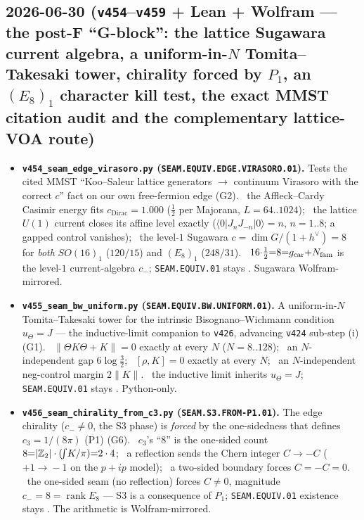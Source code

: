 \subsection*{2026-06-30 (\texttt{v454}--\texttt{v459} + Lean + Wolfram --- the post-F ``G-block'': the lattice Sugawara current algebra, a uniform-in-$N$ Tomita--Takesaki tower, chirality forced by $P_1$, an $(E_8)_1$ character kill test, the exact MMST citation audit and the complementary lattice-VOA route)}
\begin{itemize}
\item \textbf{\texttt{v454\_seam\_edge\_virasoro.py} (\texttt{SEAM.EQUIV.EDGE.VIRASORO.01}).} Tests the cited MMST
``Koo--Saleur lattice generators $\to$ continuum Virasoro with the correct $c$'' fact on our own free-fermion edge
(G2). \mE\ the Affleck--Cardy Casimir energy fits $c_{\mathrm{Dirac}}{=}1.000$ ($\tfrac12$ per Majorana, $L{=}64..1024$);
\mE\ the lattice $U(1)$ current closes its affine level exactly ($\langle0|J_nJ_{-n}|0\rangle{=}n$, $n{=}1..8$; a gapped
control vanishes); \mE\ the level-$1$ Sugawara $c{=}\dim G/(1{+}h^\vee){=}8$ for \emph{both} $SO(16)_1$ ($120/15$) and
$(E_8)_1$ ($248/31$). \mC\ $16{\cdot}\tfrac12{=}8{=}g_{\mathrm{car}}{+}N_{\mathrm{fam}}$ is the level-$1$ current-algebra $c_-$;
\texttt{SEAM.EQUIV.01} stays \mO. Sugawara Wolfram-mirrored.
\item \textbf{\texttt{v455\_seam\_bw\_uniform.py} (\texttt{SEAM.EQUIV.BW.UNIFORM.01}).} A uniform-in-$N$
Tomita--Takesaki tower for the intrinsic Bisognano--Wichmann condition $u_\Theta{=}J$ --- the inductive-limit companion
to \texttt{v426}, advancing \texttt{v424} sub-step (i) (G1). \mE\ $\|\Theta K\Theta{+}K\|{=}0$ exactly at every $N$
($N{=}8..128$); \mE\ an $N$-independent gap $6\log\tfrac32$; \mE\ $[\rho,K]{=}0$ exactly at every $N$; \mE\ an
$N$-independent neg-control margin $2\|K\|$. \mC\mO\ the inductive limit inherits $u_\Theta{=}J$;
\texttt{SEAM.EQUIV.01} stays \mO. Python-only.
\item \textbf{\texttt{v456\_seam\_chirality\_from\_c3.py} (\texttt{SEAM.S3.FROM-P1.01}).} The edge chirality
($c_-{\neq}0$, the S3 phase) is \emph{forced} by the one-sidedness that defines $c_3{=}1/(8\pi)$ (P1) (G6). \mE\
$c_3$'s ``$8$'' is the one-sided count $8{=}|\mathbb{Z}_2|\cdot(\!\int\!K/\pi){=}2\cdot4$; \mE\ a reflection sends the Chern
integer $C{\to}{-}C$ ($+1\!\to\!-1$ on the $p{+}ip$ model); \mE\ a two-sided boundary forces $C{=}{-}C{=}0$. \mC\ the
one-sided seam (no reflection) forces $C{\neq}0$, magnitude $c_-{=}8{=}\operatorname{rank}E_8$ --- S3 is a consequence
of $P_1$; \texttt{SEAM.EQUIV.01} existence stays \mO. The arithmetic is Wolfram-mirrored.

\end{itemize}
